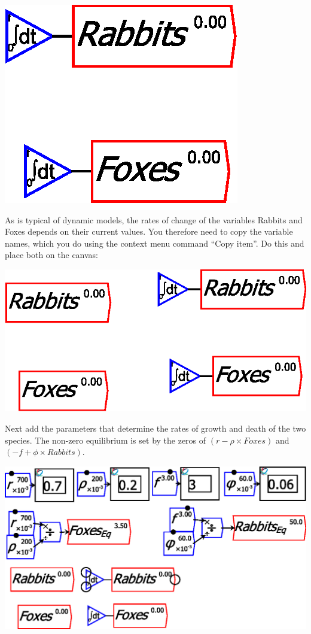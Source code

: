 \begin{center}
\includegraphics{images/PredatorPreyRabbitsFoxesIntegralsOnly}
\end{center}

As is typical of dynamic models, the rates of change of the variables
Rabbits and Foxes depends on their current values. You therefore need
to copy the variable names, which you do using the context menu command
``Copy item''. Do this and place both on the canvas:

\includegraphics{images/PredatorPreyRabbitsFoxes02}

Next add the parameters that determine the rates of growth and death
of the two species. The non-zero equilibrium is set by the zeros of
$\left(r-\rho\times Foxes\right)$ and $\left(-f+\phi\times Rabbits\right)$.

\noindent\includegraphics[width=\textwidth]{images/PredatorPreyRabbitsFoxes03ParametersAdded}

